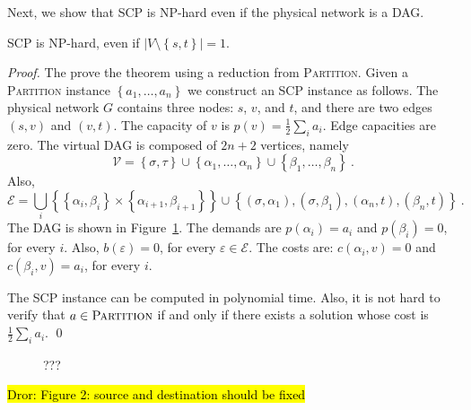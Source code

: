 \documentclass[runningheads]{llncs}
\newcommand{\set}[1]{\left\{ #1 \right\}}
\newcommand{\abs}[1]{\left| #1 \right|}
\newcommand{\half}{\frac{1}{2}}
\newcommand{\eps}{\varepsilon}
\newcommand{\scp}{\textsc{SCP}\xspace}
\newcommand{\calE}{\mathcal{E}}
\newcommand{\calV}{\mathcal{V}}
\newcommand{\dror}[1]{\sethlcolor{yellow}\hl{Dror: #1}}
\begin{document}
Next, we show that \scp is NP-hard even if the physical network is a
DAG.

\begin{theorem}
\scp is NP-hard, even if $\abs{V \setminus \set{s,t}} = 1$.
\end{theorem}
\begin{proof}
The prove the theorem using a reduction from \textsc{Partition}.
Given a \textsc{Partition} instance $\set{a_1, \ldots, a_n}$ we
construct an \scp instance as follows.
%
The physical network $G$ contains three nodes: $s$, $v$, and $t$, and
there are two edges $(s,v)$ and $(v,t)$.  The capacity of $v$ is $p(v)
= \half \sum_i a_i$.  Edge capacities are zero.
%
The virtual DAG is composed of $2n+2$ vertices, namely
\[
\calV
= \set{\sigma,\tau}
  \cup \set{\alpha_1, \ldots, \alpha_n}
  \cup \set{\beta_1, \ldots, \beta_n}
~.
\]
Also,
\[
\calE
= \bigcup_i \set{ \set{\alpha_i,\beta_i} \times \set{\alpha_{i+1},\beta_{i+1}} } 
  \cup
  \set{ (\sigma,\alpha_1), (\sigma,\beta_1), (\alpha_n,t), (\beta_n,t) }
~.
\]
The DAG is shown in Figure~\ref{fig:dag}.
%
The demands are $p(\alpha_i) = a_i$ and $p(\beta_i) = 0$, for every
$i$.  Also, $b(\eps) = 0$, for every $\eps \in \calE$.  The costs are:
$c(\alpha_i,v) = 0$ and $c(\beta_i,v) = a_i$, for every $i$.

The \scp instance can be computed in polynomial time.
%
Also, it is not hard to verify that $a \in \textsc{Partition}$ if and
only if there exists a solution whose cost is $\half \sum_i a_i$.
%
\qed
\end{proof}

\begin{figure}
\centering

\caption{???}
\label{fig:dag}
\end{figure}

\dror{Figure 2: source and destination should be fixed}
\end{document}
